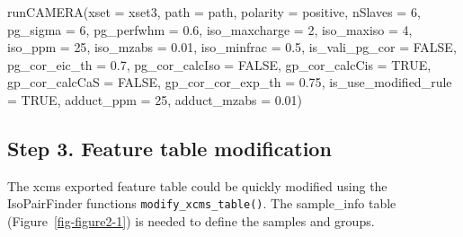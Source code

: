 \documentclass[
  letterpaper,
  DIV=11,
  numbers=noendperiod]{scrreprt}
\newenvironment{Shaded}{\begin{snugshade}}{\end{snugshade}}
\newcommand{\AttributeTok}[1]{\textcolor[rgb]{0.40,0.45,0.13}{#1}}
\newcommand{\ConstantTok}[1]{\textcolor[rgb]{0.56,0.35,0.01}{#1}}
\newcommand{\DecValTok}[1]{\textcolor[rgb]{0.68,0.00,0.00}{#1}}
\newcommand{\FloatTok}[1]{\textcolor[rgb]{0.68,0.00,0.00}{#1}}
\newcommand{\FunctionTok}[1]{\textcolor[rgb]{0.28,0.35,0.67}{#1}}
\newcommand{\NormalTok}[1]{\textcolor[rgb]{0.00,0.23,0.31}{#1}}
\newcommand{\StringTok}[1]{\textcolor[rgb]{0.13,0.47,0.30}{#1}}
\begin{document}
\begin{Shaded}
\begin{Highlighting}[]
\FunctionTok{runCAMERA}\NormalTok{(}\AttributeTok{xset =}\NormalTok{ xset3,}
          \AttributeTok{path =}\NormalTok{ path,}
          \AttributeTok{polarity =} \StringTok{\textquotesingle{}positive\textquotesingle{}}\NormalTok{,}
          \AttributeTok{nSlaves =} \DecValTok{6}\NormalTok{,}
          \AttributeTok{pg\_sigma =} \DecValTok{6}\NormalTok{,}
          \AttributeTok{pg\_perfwhm =} \FloatTok{0.6}\NormalTok{,}
          \AttributeTok{iso\_maxcharge =} \DecValTok{2}\NormalTok{,}
          \AttributeTok{iso\_maxiso =} \DecValTok{4}\NormalTok{,}
          \AttributeTok{iso\_ppm =} \DecValTok{25}\NormalTok{,}
          \AttributeTok{iso\_mzabs =} \FloatTok{0.01}\NormalTok{,}
          \AttributeTok{iso\_minfrac =} \FloatTok{0.5}\NormalTok{,}
          \AttributeTok{is\_vali\_pg\_cor =} \ConstantTok{FALSE}\NormalTok{,}
          \AttributeTok{pg\_cor\_eic\_th =} \FloatTok{0.7}\NormalTok{,}
          \AttributeTok{pg\_cor\_calcIso =} \ConstantTok{FALSE}\NormalTok{,}
          \AttributeTok{gp\_cor\_calcCis =} \ConstantTok{TRUE}\NormalTok{,}
          \AttributeTok{gp\_cor\_calcCaS =} \ConstantTok{FALSE}\NormalTok{,}
          \AttributeTok{gp\_cor\_cor\_exp\_th =} \FloatTok{0.75}\NormalTok{,}
          \AttributeTok{is\_use\_modified\_rule =} \ConstantTok{TRUE}\NormalTok{,}
          \AttributeTok{adduct\_ppm =} \DecValTok{25}\NormalTok{,}
          \AttributeTok{adduct\_mzabs =} \FloatTok{0.01}\NormalTok{)}
\end{Highlighting}
\end{Shaded}

\subsection{Step 3. Feature table
modification}\label{step-3.-feature-table-modification}

The xcms exported feature table could be quickly modified using the
IsoPairFinder functions \texttt{modify\_xcms\_table()}. The sample\_info
table (Figure~\ref{fig-figure2-1}) is needed to define the samples and
groups.
\end{document}
